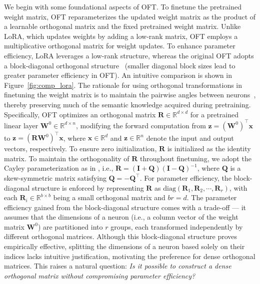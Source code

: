 We begin with some foundational aspects of OFT. To finetune the pretrained weight matrix, OFT reparameterizes the updated weight matrix as the product of a learnable orthogonal matrix and the fixed pretrained weight matrix. Unlike LoRA, which updates weights by adding a low-rank matrix, OFT employs a multiplicative orthogonal matrix for weight updates. To enhance parameter efficiency, LoRA leverages a low-rank structure, whereas the original OFT adopts a block-diagonal orthogonal structure~\cite{qiu2023controlling} (smaller diagonal block sizes lead to greater parameter efficiency in OFT). An intuitive comparison is shown in Figure~\ref{fig:comp_lora}. The rationale for using orthogonal transformations in finetuning the weight matrix is to maintain the pairwise angles between neurons~\cite{liu2018learning,liu2021orthogonal,qiu2023controlling}, thereby preserving much of the semantic knowledge acquired during pretraining. Specifically, OFT optimizes an orthogonal matrix $\bm{R}\in\mathbb{R}^{d\times d}$ for a pretrained linear layer $\bm{W}^0\in\mathbb{R}^{d\times n}$, modifying the forward computation from $\bm{z}=(\bm{W}^0)^\top\bm{x}$ to $\bm{z}=(\bm{R}\bm{W}^0)^\top\bm{x}$, where $\bm{x}\in\mathbb{R}^{d}$ and $\bm{z}\in\mathbb{R}^{n}$ denote the input and output vectors, respectively. To ensure zero initialization, $\bm{R}$ is initialized as the identity matrix. To maintain the orthogonality of $\bm{R}$ throughout finetuning, we adopt the Cayley parameterization as in \cite{qiu2023controlling,liu2021orthogonal}, i.e., $\bm{R}=(\bm{I}+\bm{Q})(\bm{I}-\bm{Q})^{-1}$, where $\bm{Q}$ is a skew-symmetric matrix satisfying $\bm{Q}=-\bm{Q}^\top$. For parameter efficiency, the block-diagonal structure is enforced by representing $\bm{R}$ as $\text{diag}(\bm{R}_1,\bm{R}_2,\cdots,\bm{R}_r)$, with each $\bm{R}_i\in\mathbb{R}^{b\times b}$ being a small orthogonal matrix and $br=d$. The parameter efficiency gained from the block-diagonal structure comes with a trade-off — it assumes that the dimensions of a neuron (i.e., a column vector of the weight matrix $\bm{W}^0$) are partitioned into $r$ groups, each transformed independently by different orthogonal matrices. Although this block-diagonal structure proves empirically effective, splitting the dimensions of a neuron based solely on their indices lacks intuitive justification, motivating the preference for dense orthogonal matrices. This raises a natural question: \emph{Is it possible to construct a dense orthogonal matrix without compromising parameter efficiency?}

